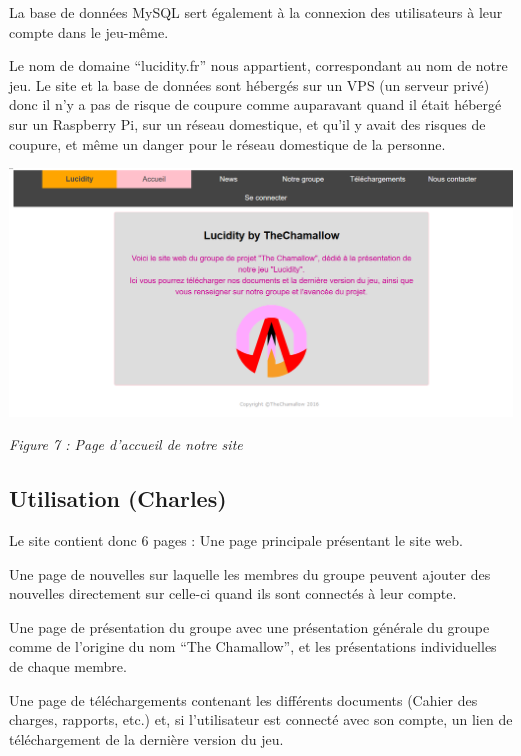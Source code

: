 \documentclass[a4paper , 12pt]{article}
\begin{document}
La base de données MySQL sert également à la connexion des utilisateurs à leur compte dans le jeu-même.

Le nom de domaine “lucidity.fr” nous appartient, correspondant au nom de notre jeu. Le site et la base de données sont hébergés sur un VPS (un serveur privé) donc il n’y a pas de risque de coupure comme auparavant quand il était hébergé sur un Raspberry Pi, sur un réseau domestique, et qu’il y avait des risques de coupure, et même un danger pour le réseau domestique de la personne.

\quad
\begin {centering}

\includegraphics[scale = 0.35]{Le_site.png}

\textit{Figure 7 : Page d'accueil de notre site}

\end{centering}

\newpage

	\subsection{Utilisation (Charles)}

	\quad

Le site contient donc 6 pages : 
Une page principale présentant le site web. 

Une page de nouvelles sur laquelle les membres du groupe peuvent ajouter des nouvelles directement sur celle-ci quand ils sont connectés à leur compte.

Une page de présentation du groupe avec une présentation générale du groupe comme de l’origine du nom “The Chamallow”, et les présentations individuelles de chaque membre.

Une page de téléchargements contenant les différents documents (Cahier des charges, rapports, etc.) et, si l’utilisateur est connecté avec son compte, un lien de téléchargement de la dernière version du jeu.
\end{document}
